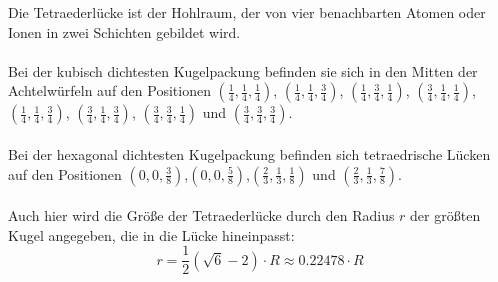 \documentclass[a4paper,titlepage]{scrartcl}
\numberwithin{equation}{section}
\begin{document}
Die Tetraederlücke ist der Hohlraum, der von vier benachbarten Atomen oder Ionen in zwei Schichten gebildet wird.\\ \\
Bei der kubisch dichtesten Kugelpackung befinden sie sich in den Mitten der Achtelwürfeln auf den Positionen $(\frac{1}{4},\frac{1}{4},\frac{1}{4})$, $(\frac{1}{4},\frac{1}{4},\frac{3}{4})$, $(\frac{1}{4},\frac{3}{4},\frac{1}{4})$, $(\frac{3}{4},\frac{1}{4},\frac{1}{4})$, $(\frac{1}{4},\frac{1}{4},\frac{3}{4})$, $(\frac{3}{4},\frac{1}{4},\frac{3}{4})$, $(\frac{3}{4},\frac{3}{4},\frac{1}{4})$ und $(\frac{3}{4},\frac{3}{4},\frac{3}{4})$.\\ \\
Bei der hexagonal dichtesten Kugelpackung befinden sich tetraedrische Lücken auf den Positionen $(0,0,\frac{3}{8})$,$(0,0,\frac{5}{8})$,$(\frac{2}{3},\frac{1}{3},\frac{1}{8})$ und $(\frac{2}{3},\frac{1}{3},\frac{7}{8})$.\\\\
Auch hier wird die Größe der Tetraederlücke durch den Radius $r$ der größten Kugel angegeben, die in die Lücke hineinpasst:
\begin{equation*}
r=\frac{1}{2}(\sqrt{6}-2) \cdot R\approx0.22478 \cdot R
\end{equation*}
\end{document}
